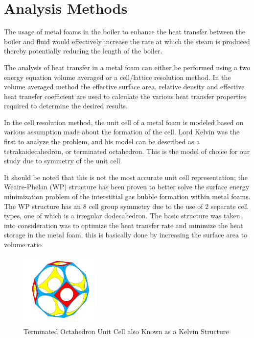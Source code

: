 \documentclass[compileTAMUreport.tex]{subfiles}
\begin{document}
\section{Analysis Methods}
The usage of metal foams in the boiler to enhance the heat transfer between the boiler and fluid  would effectively increase the rate at which the steam is produced thereby potentially reducing the length of the boiler.

The analysis of heat transfer in a metal foam can either be performed using a two energy equation volume averaged or a cell/lattice resolution method.
In the volume averaged method the effective surface area, relative density and effective heat transfer coefficient  are used to calculate the various heat transfer properties required to determine the desired results.

\cite{Du2010}
In the cell resolution method, the unit cell of a metal foam is modeled based on various assumption made about the formation of the cell. 
Lord Kelvin was the first to analyze the problem, and his model can be described as a tetrakaidecahedron, or terminated octahedron.
\cite{Kopanidis2010}
This is the model of choice for our study due to symmetry of the unit cell.

It should be noted that this is not the most accurate unit cell representation; the Weaire-Phelan (WP) structure has been proven to better solve the surface energy minimization problem of the interstitial gas bubble formation within metal foams.
The WP structure has an 8 cell group symmetry due to the use of 2 separate cell types, one of which is a irregular dodecahedron.
The basic structure was taken into consideration was to optimize the heat transfer rate and minimize the heat storage in the metal foam, this is basically done by increasing the surface area to volume ratio.
\cite{Kusner1996}


\begin{figure}[H]
\begin{center}
\includegraphics[width=0.35\textwidth]{./figure/TruncatedOctohedronSphereRemoved}
\end{center}
\caption{Terminated Octahedron Unit Cell also Known as a Kelvin Structure}
\label{fig:trucOctModel-UnitCell}
\end{figure}
\end{document}
